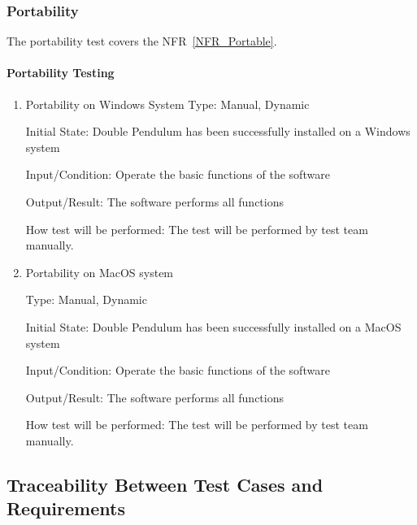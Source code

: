 \documentclass[12pt, titlepage]{article}
\begin{document}
\subsubsection{Portability} \label{PortTest}
The portability test covers the NFR~\ref{NFR_Portable}.

\paragraph{Portability Testing\\}

\begin{enumerate}
\item{Portability on Windows System} 
Type: Manual, Dynamic

Initial State: Double Pendulum has been successfully installed on a Windows
system
          
Input/Condition: Operate the basic functions of the software
          
Output/Result: The software performs all functions
          
How test will be performed: The test will be performed by test team manually.

\item{Portability on MacOS system}

Type: Manual, Dynamic

Initial State: Double Pendulum has been successfully installed on a MacOS system
          
Input/Condition: Operate the basic functions of the software
          
Output/Result: The software performs all functions
          
How test will be performed: The test will be performed by test team manually.

\end{enumerate}


\subsection{Traceability Between Test Cases and Requirements}
\end{document}
